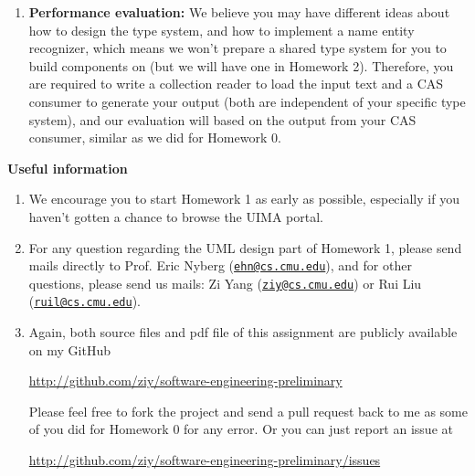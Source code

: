 \documentclass[oneside]{memoir}
\begin{document}
\begin{titlingpage}
\begin{minipage}{1.2\textwidth}
\begin{enumerate}
\item \textbf{Performance evaluation:} We believe you may have different ideas
about how to design the type system, and how to implement a name entity
recognizer, which means we won't prepare a shared type system for you to build
components on (but we will have one in Homework 2). Therefore, you are required
to write a collection reader to load the input text and a CAS consumer to
generate your output (both are independent of your specific type system), and
our evaluation will based on the output from your CAS consumer, similar as we
did for Homework 0.

\end{enumerate}

\textbf{Useful information}
\begin{enumerate}
\item We encourage you to start Homework 1 as early as possible, especially if
you haven't gotten a chance to browse the UIMA portal.

\item For any question regarding the UML design part of Homework 1, please send
mails directly to Prof. Eric Nyberg
(\href{mailto:ehn@cs.cmu.edu}{\nolinkurl{ehn@cs.cmu.edu}}), and for other
questions, please send us mails: Zi Yang
(\href{mailto:ziy@cs.cmu.edu}{\nolinkurl{ziy@cs.cmu.edu}}) or Rui Liu
(\href{mailto:ruil@cs.cmu.edu}{\nolinkurl{ruil@cs.cmu.edu}}).

\item Again, both source files and pdf file of this assignment are
publicly available on my GitHub

\url{http://github.com/ziy/software-engineering-preliminary}

Please feel free to fork the project and send a pull request back to me as some
of you did for Homework 0 for any error. Or you can just report an issue at

\url{http://github.com/ziy/software-engineering-preliminary/issues}

\end{enumerate}

\end{minipage}
\hspace{-0.1\textwidth}

\end{titlingpage}








\end{document}
